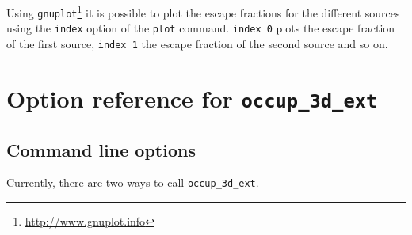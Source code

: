 \documentclass[a4paper,10pt]{article}
\begin{document}
Using \texttt{gnuplot}\footnote{\url{http://www.gnuplot.info}} it is possible  
to plot the escape fractions for the different sources using the \texttt{index} 
option of the \texttt{plot} command.
\texttt{index 0} plots the escape fraction of the first source,  \texttt{index 
1} the escape fraction of the second source and so on. 


\section{Option reference for \texttt{occup\_3d\_ext}}
\label{sec:options}
\subsection{Command line options}
\label{sec:commandlineoptions}
Currently, there are two ways to call \texttt{occup\_3d\_ext}. 
\end{document}
